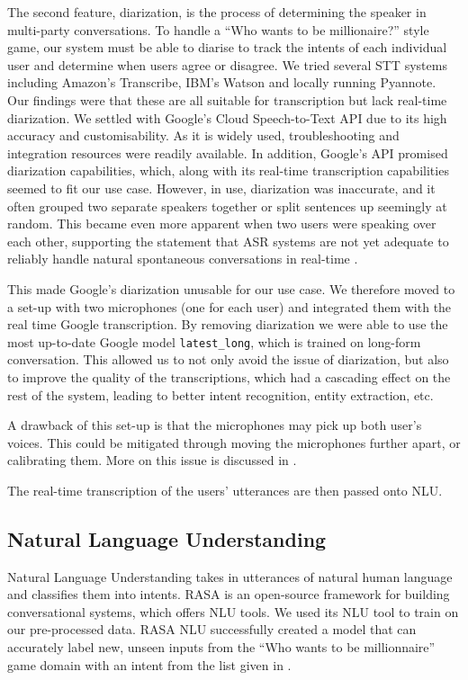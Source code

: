 \documentclass[hidelinks, 11pt]{article}
\begin{document}
The second feature, diarization, is the process of determining the speaker in multi-party conversations. To handle a ``Who wants to be millionaire?'' style game, our system must be able to diarise to track the intents of each individual user and determine when users agree or disagree. We tried several STT systems including Amazon's Transcribe, IBM's Watson and locally running Pyannote. Our findings were that these are all suitable for transcription but lack real-time diarization. We settled with Google's Cloud Speech-to-Text API due to its high accuracy and customisability. As it is widely used, troubleshooting and integration resources were readily available. In addition, Google's API promised diarization capabilities, which, along with its real-time transcription capabilities seemed to fit our use case. However, in use, diarization was inaccurate, and it often grouped two separate speakers together or split sentences up seemingly at random. This became even more apparent when two users were speaking over each other, supporting the statement that ASR systems are not yet adequate to reliably handle natural spontaneous conversations in real-time \cite{addlesee_comprehensive_2020}.

This made Google's diarization unusable for our use case. We therefore moved to a set-up with two microphones (one for each user) and integrated them with the real time Google transcription. By removing diarization we were able to use the most up-to-date Google model \verb|latest_long|, which is trained on long-form conversation. This allowed us to not only avoid the issue of diarization, but also to improve the quality of the transcriptions, which had a cascading effect on the rest of the system, leading to better intent recognition, entity extraction, etc.

A drawback of this set-up is that the microphones may pick up both user's voices. This could be mitigated through moving the microphones further apart, or calibrating them. More on this issue is discussed in .

The real-time transcription of the users' utterances are then passed onto NLU.

\subsection{Natural Language Understanding}
\label{subsec:nlu}

Natural Language Understanding takes in utterances of natural human language and classifies them into intents. RASA is an open-source framework for building conversational systems, which offers NLU tools. We used its NLU tool to train on our pre-processed data. RASA NLU successfully created a model that can accurately label new, unseen inputs from the ``Who wants to be millionnaire'' game domain with an intent from the list given in .
\end{document}
